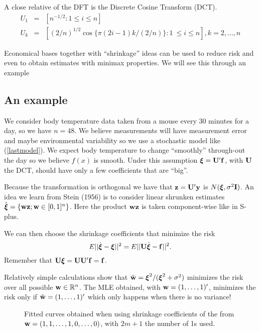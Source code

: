 A close relative of the DFT is the 
Discrete Cosine Transform (DCT).
\begin{eqnarray*}
  U_1 &=& [n^{-1/2}: 1 \leq i \leq n] \\
  U_k &=& [(2/n)^{1/2}\cos\{\pi(2i-1)k/(2/n)\} : 1\ \leq i \leq n],
  k=2,\dots,n 
\end{eqnarray*}



Economical bases together with ``shrinkage'' ideas can be used to
reduce risk and even to obtain estimates with minimax properties. We
will see this through an example

\subsection{An example}
We consider body temperature data taken from a mouse every 30 minutes
for a day, so we have $n=48$. We believe measurements will have  
measurement error and maybe environmental variability so we use a
stochastic model  like
(\ref{lastmodel}). We expect body temperature to  change 
``smoothly'' through-out the day  so we believe $f(x)$ is
smooth. Under this assumption $\mbox{\boldmath $\xi$\unboldmath}={\mathbf U}'{\mathbf f}$, with ${\mathbf U}$ the DCT,
should have only a few coefficients that are ``big''. 

Because the transformation is orthogonal we have that ${\mathbf z} = {\mathbf U}'{\mathbf y}$
is $N(\mbox{\boldmath $\xi$\unboldmath},\sigma^2 {\mathbf I})$. An idea we learn from Stein (1956)
is to consider linear shrunken estimates $\hat{\mbox{\boldmath $\xi$\unboldmath}} = \{ {\mathbf w}{\mathbf z}; {\mathbf w}
\in [0,1]^n\}$. Here the product ${\mathbf w} {\mathbf z}$ is taken component-wise
like in S-plus. 

We can then choose the shrinkage coefficients that
minimize the risk
\[
E || \hat{\mbox{\boldmath $\xi$\unboldmath}} - \mbox{\boldmath $\xi$\unboldmath}||^2 = E || {\mathbf U} \hat{\mbox{\boldmath $\xi$\unboldmath}}  - {\mathbf f}||^2.
\]
Remember that ${\mathbf U} \mbox{\boldmath $\xi$\unboldmath}  = {\mathbf U} {\mathbf U}'{\mathbf f} = {\mathbf f}$.

Relatively simple calculations show that  $\tilde{{\mathbf w}} = \mbox{\boldmath $\xi$\unboldmath}^2/(\mbox{\boldmath $\xi$\unboldmath}^2
+ \sigma^2)$ minimizes the risk over all possible ${\mathbf w} \in {\mathbb
  R}^n$.  The MLE obtained, with ${\mathbf w} = (1,\dots,1)'$, minimizes 
the risk only if $\tilde{{\mathbf w}} =  (1,\dots,1)'$ which only happens when
there is no variance!   
 

\begin{figure}[htb]
\caption{\label{f6.4.2}Fitted curves obtained when using shrinkage
coefficients of the from ${\mathbf w} = 
(1,1,\dots,1,0,\dots,0)$, with $2m+1$ the number of 1s used.}
\begin{center}
\end{center}
\end{figure}

